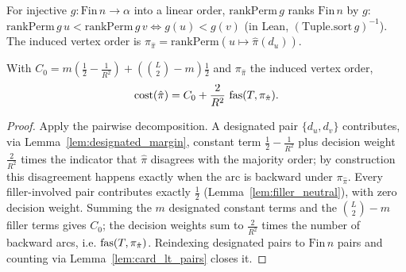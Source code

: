 \begin{definition}
\label{def:induced_order}
\leanok
For injective $g : \mathrm{Fin}\,n \to \alpha$ into a linear order,
$\mathrm{rankPerm}\,g$ ranks $\mathrm{Fin}\,n$ by $g$:
$\mathrm{rankPerm}\,g\,u < \mathrm{rankPerm}\,g\,v \iff g(u) < g(v)$ (in Lean,
$(\mathrm{Tuple.sort}\,g)^{-1}$). The induced vertex order is
$\pi_{\hat\pi} = \mathrm{rankPerm}(u \mapsto \hat\pi(d_u))$.
\end{definition}

\begin{lemma}
\label{lem:objective_identity}
\leanok
{}
With $C_0 = m(\tfrac12 - \tfrac1{R^2}) + (\binom L2 - m)\tfrac12$ and
$\pi_{\hat\pi}$ the induced vertex order,
\[
  \mathrm{cost}(\hat\pi) = C_0 + \frac{2}{R^2}\,\operatorname{fas}(T, \pi_{\hat\pi}).
\]
\end{lemma}
\begin{proof}
\leanok
{}
Apply the pairwise decomposition. A designated pair $\{d_u,d_v\}$ contributes,
via Lemma~\ref{lem:designated_margin}, constant term $\tfrac12 - \tfrac1{R^2}$
plus decision weight $\tfrac2{R^2}$ times the indicator that $\hat\pi$ disagrees
with the majority order; by construction this disagreement happens exactly when
the arc is backward under $\pi_{\hat\pi}$. Every filler-involved pair contributes
exactly $\tfrac12$ (Lemma~\ref{lem:filler_neutral}), with zero decision weight.
Summing the $m$ designated constant terms and the $\binom L2 - m$ filler terms
gives $C_0$; the decision weights sum to $\tfrac2{R^2}$ times the number of
backward arcs, i.e. $\operatorname{fas}(T,\pi_{\hat\pi})$. Reindexing designated pairs to
$\mathrm{Fin}\,n$ pairs and counting via Lemma~\ref{lem:card_lt_pairs} closes it.
\end{proof}

